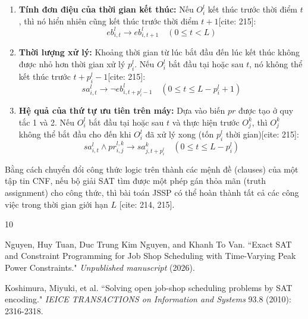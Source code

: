\documentclass[a4paper,fleqn]{cas-sc} %
\begin{document}
\begin{enumerate}
    \item \textbf{Tính đơn điệu của thời gian kết thúc:} Nếu $O_i^l$ kết thúc trước thời điểm $t$, thì nó hiển nhiên cũng kết thúc trước thời điểm $t+1$[cite: 215]:
    \begin{equation}
        eb_{i,t}^l \to eb_{i,t+1}^l \quad (0 \le t < L)
    \end{equation}
    
    \item \textbf{Thời lượng xử lý:} Khoảng thời gian từ lúc bắt đầu đến lúc kết thúc không được nhỏ hơn thời gian xử lý $p_i^l$. Nếu $O_i^l$ bắt đầu tại hoặc sau $t$, nó không thể kết thúc trước $t + p_i^l - 1$[cite: 215]:
    \begin{equation}
        sa_{i,t}^l \to \neg eb_{i, t+p_i^l-1}^l \quad (0 \le t \le L - p_i^l + 1)
    \end{equation}
    
    \item \textbf{Hệ quả của thứ tự ưu tiên trên máy:} Dựa vào biến $pr$ được tạo ở quy tắc 1 và 2. Nếu $O_i^l$ bắt đầu tại hoặc sau $t$ và thực hiện trước $O_j^k$, thì $O_j^k$ không thể bắt đầu cho đến khi $O_i^l$ đã xử lý xong (tốn $p_i^l$ thời gian)[cite: 215]:
    \begin{equation}
        sa_{i,t}^l \land pr_{i,j}^{l,k} \to sa_{j, t+p_i^l}^k \quad (0 \le t \le L - p_i^l)
    \end{equation}
\end{enumerate}

Bằng cách chuyển đổi công thức logic trên thành các mệnh đề (clauses) của một tập tin CNF, nếu bộ giải SAT tìm được một phép gán thỏa mãn (truth assignment) cho công thức, thì bài toán JSSP có thể hoàn thành tất cả các công việc trong thời gian giới hạn $L$ \cite{koshimura2010solving}[cite: 214, 215].



\begin{thebibliography}{10}

Nguyen, Huy Tuan, Duc Trung Kim Nguyen, and Khanh To Van.
\newblock ``Exact SAT and Constraint Programming for Job Shop Scheduling with Time-Varying Peak Power Constraints."
\newblock \emph{Unpublished manuscript} (2026).

Koshimura, Miyuki, et al.
\newblock ``Solving open job-shop scheduling problems by SAT encoding."
\newblock \emph{IEICE TRANSACTIONS on Information and Systems} 93.8 (2010): 2316-2318.

\end{thebibliography}
\end{document}
